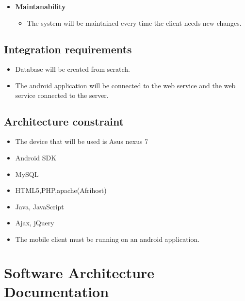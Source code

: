 \documentclass[10pt,a4paper]{article}
\begin{document}
\begin{itemize}
 \item\textbf{Maintanability}					
 \begin{itemize}
 	\item The system will be maintained every time the client needs new changes.
 \end{itemize}        
 
\end{itemize}

\subsection{Integration requirements}
\begin{itemize} 
\item Database will be created from scratch.
\item The android application will be connected to the web service and the web service connected to the server.
\end{itemize}
   
\subsection{Architecture constraint}                       
\begin{itemize}
\item The device that will be used is Asus nexus 7
\item Android SDK
\item MySQL
\item HTML5,PHP,apache(Afrihost)
\item Java, JavaScript
\item Ajax, jQuery
\item The mobile client must be running on an android application.
\end{itemize}
\pagebreak

\section{Software Architecture Documentation}
\end{document}
